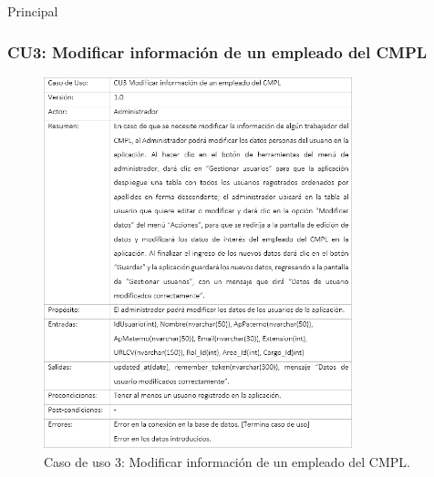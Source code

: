 \begin{UCtrayectoria}{Principal}
\newpage

		\subsubsection{CU3: Modificar información de un empleado del CMPL}
			\begin{figure}[htbp!]
				\centering
					\includegraphics[width=0.8\textwidth]{images/CU/CU3}
					\caption{Caso de uso 3: Modificar información de un empleado del CMPL.}
				\label{Tabla}
			\end{figure}
			

\end{UCtrayectoria}
